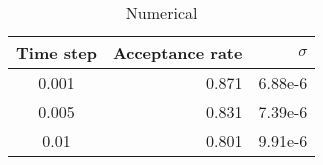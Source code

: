 \documentclass[english, a4paper]{article}
\begin{document}
\begin{table}[H]
  \centering
  \begin{tabular}{ | c | r | r |}
    \hline
    Time step& Acceptance rate& $\sigma$ \\*
    \hline
    0.001& 0.871& 6.88e-6 \\*
    \hline
    0.005& 0.831& 7.39e-6 \\*
    \hline
    0.01&  0.801& 9.91e-6 \\*
    \hline
  \end{tabular}
  \caption{Numerical}
  \label{tab:Tabell1}
\end{table}









































 

























\end{document}
